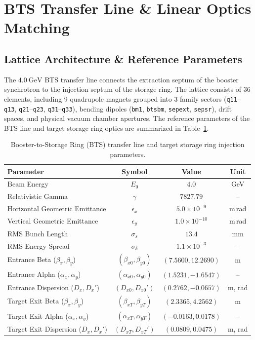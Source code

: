 \documentclass[a4paper,11pt]{article}
\begin{document}
\section{BTS Transfer Line \& Linear Optics Matching}
\label{sec:bts_optics}

\subsection{Lattice Architecture \& Reference Parameters}

The $4.0~\mathrm{GeV}$ BTS transfer line connects the extraction septum of the booster synchrotron to the injection septum of the storage ring. The lattice consists of 36 elements, including 9 quadrupole magnets grouped into 3 family sectors (\texttt{q11}--\texttt{q13}, \texttt{q21}--\texttt{q23}, \texttt{q31}--\texttt{q33}), bending dipoles (\texttt{bm1}, \texttt{btsbm}, \texttt{sepext}, \texttt{sepsr}), drift spaces, and physical vacuum chamber apertures. The reference parameters of the BTS line and target storage ring optics are summarized in Table~\ref{tab:bts_parameters}.

\begin{table}[htbp]
\centering
\caption{Booster-to-Storage Ring (BTS) transfer line and target storage ring injection parameters.}
\label{tab:bts_parameters}
\begin{tabular}{lccc}
\hline\hline
Parameter & Symbol & Value & Unit \\
\hline
Beam Energy & $E_0$ & $4.0$ & GeV \\
Relativistic Gamma & $\gamma$ & $7827.79$ & -- \\
Horizontal Geometric Emittance & $\epsilon_x$ & $5.0 \times 10^{-9}$ & m\,rad \\
Vertical Geometric Emittance & $\epsilon_y$ & $1.0 \times 10^{-10}$ & m\,rad \\
RMS Bunch Length & $\sigma_s$ & $13.4$ & mm \\
RMS Energy Spread & $\sigma_\delta$ & $1.1 \times 10^{-3}$ & -- \\
Entrance Beta ($\beta_x, \beta_y$) & $(\beta_{x0}, \beta_{y0})$ & $(7.5600, 12.2690)$ & m \\
Entrance Alpha ($\alpha_x, \alpha_y$) & $(\alpha_{x0}, \alpha_{y0})$ & $(1.5231, -1.6547)$ & -- \\
Entrance Dispersion ($D_x, D_x'$) & $(D_{x0}, D_{x0}')$ & $(0.2762, -0.0657)$ & m, rad \\
Target Exit Beta ($\beta_x, \beta_y$) & $(\beta_{xT}, \beta_{yT})$ & $(2.3365, 4.2562)$ & m \\
Target Exit Alpha ($\alpha_x, \alpha_y$) & $(\alpha_{xT}, \alpha_{yT})$ & $(-0.0163, 0.0178)$ & -- \\
Target Exit Dispersion ($D_x, D_x'$) & $(D_{xT}, D_{xT}')$ & $(0.0809, 0.0475)$ & m, rad \\
\hline\hline
\end{tabular}
\end{table}
\end{document}
